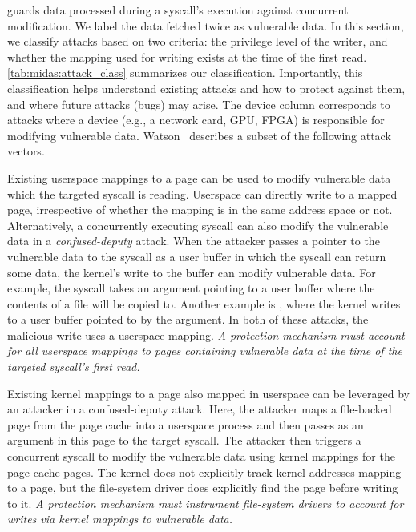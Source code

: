 \midas guards data processed during a syscall's execution against concurrent 
modification.
We label the data fetched twice as vulnerable data.
In this section, we classify attacks based on two criteria: the
privilege level of the writer, and whether the mapping used for writing
exists at the time of the first read. 
\autoref{tab:midas:attack_class} summarizes our classification.
Importantly, this classification helps understand existing attacks and how to
protect against them, and where future attacks (bugs) may arise.
The device column corresponds to attacks where a device
(e.g., a network card, GPU, FPGA) is responsible for modifying vulnerable data.
Watson~\cite{watson2007exploiting} describes a subset of the
following attack vectors.

Existing userspace mappings to a page can be used to modify
vulnerable data which the targeted syscall is reading.
Userspace can directly write to a mapped page, irrespective of whether the 
mapping is in the same address space or not.
Alternatively, a concurrently executing syscall can also modify the
vulnerable data in a \emph{confused-deputy} attack.
When the attacker passes a pointer to the vulnerable data to
the syscall as a user buffer in which the syscall can return some
data, the kernel's write to the buffer can modify vulnerable data.
For example, the  syscall takes an argument pointing
to a user buffer where the contents of a file will be copied to.
Another example is , where the kernel writes to
a user buffer pointed to by the  argument.
In both of these attacks, the malicious write uses a userspace
mapping.
\emph{A protection mechanism must account for all userspace
mappings to pages containing vulnerable data at the time of the
targeted syscall's first read.}

Existing kernel mappings to a page also mapped in userspace can be
leveraged by an attacker in a confused-deputy attack.
Here, the attacker maps a file-backed page from the page cache into a
userspace process and then passes as an argument in this page to the
target syscall.
The attacker then triggers a concurrent  syscall to modify the
vulnerable data using kernel mappings for the page cache pages.
The kernel does not explicitly track kernel addresses mapping to a page,
but the file-system driver does explicitly find the page before writing to it.
\emph{A protection mechanism must instrument file-system
drivers to account for writes via kernel mappings to vulnerable data.}

